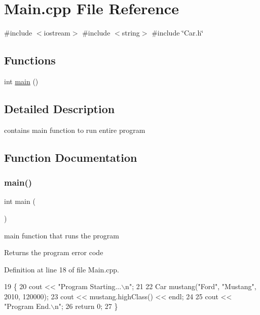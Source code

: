\section{Main.\+cpp File Reference}
\label{_main_8cpp}
{\ttfamily \#include $<$iostream$>$}\newline
{\ttfamily \#include $<$string$>$}\newline
{\ttfamily \#include \char`\"{}Car.\+h\char`\"{}}\newline
\subsection*{Functions}
\begin{DoxyCompactItemize}
\item 
int \hyperlink{_main_8cpp_ae66f6b31b5ad750f1fe042a706a4e3d4}{main} ()
\end{DoxyCompactItemize}


\subsection{Detailed Description}
contains main function to run entire program 

\subsection{Function Documentation}
\mbox{\label{_main_8cpp_ae66f6b31b5ad750f1fe042a706a4e3d4}} 
\subsubsection{\texorpdfstring{main()}{main()}}
{\footnotesize\ttfamily int main (\begin{DoxyParamCaption}{ }\end{DoxyParamCaption})}

main function that runs the program

\begin{DoxyReturn}{Returns}
the program error code 
\end{DoxyReturn}


Definition at line 18 of file Main.\+cpp.


\begin{DoxyCode}
19 \{
20     cout << \textcolor{stringliteral}{"Program Starting...\(\backslash\)n"};
21 
22     Car mustang(\textcolor{stringliteral}{"Ford"}, \textcolor{stringliteral}{"Mustang"}, 2010, 120000);
23     cout << mustang.highClass() << endl;
24 
25     cout << \textcolor{stringliteral}{"Program End.\(\backslash\)n"};
26     \textcolor{keywordflow}{return} 0;
27 \}
\end{DoxyCode}
